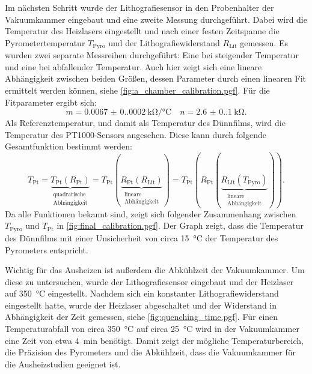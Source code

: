 Im nächsten Schritt wurde der Lithografiesensor in den Probenhalter der Vakuumkammer eingebaut und eine
zweite Messung durchgeführt.
Dabei wird die Temperatur des Heizlasers eingestellt und nach einer festen Zeitspanne die Pyrometertemperatur
$T_\mathrm{Pyro}$ und der Lithografiewiderstand $R_\mathrm{Lit}$ gemessen.
Es wurden zwei separate Messreihen durchgeführt: Eine bei steigender Temperatur und eine bei abfallender Temperatur.
Auch hier zeigt sich eine lineare Abhängigkeit zwischen beiden Größen, dessen Parameter durch einen linearen Fit
ermittelt werden können, siehe \cref{fig:a_chamber_calibration.pgf}.
Für die Fitparameter ergibt sich:
\begin{equation*}
    m = \qty{0.0067(0.0002)}{\kilo\ohm\per\degreeCelsius} \quad n = \qty{2.6(0.1)}{\kilo\ohm}.
\end{equation*}
Als Referenztemperatur, und damit als Temperatur des Dünnfilms, wird die Temperatur des PT1000-Sensors angesehen.
Diese kann durch folgende Gesamtfunktion bestimmt werden:
\begin{equation}
    T_{\mathrm{Pt}}=\underbrace{ T_{\mathrm{Pt}}(R_{\mathrm{Pt}}) }_{
        \substack{\text{quadratische} \\ \text{Abhängigkeit}}}
    =T_{\mathrm{Pt}}(\underbrace{ R_{\mathrm{Pt}}(R_{\mathrm{Lit}}) }_{
        \substack{\text{lineare} \\ \text{Abhängigkeit}}  })
    =T_{\mathrm{Pt}}(R_{\mathrm{Pt}}(\underbrace{ R_{\mathrm{Lit}}(T_{\mathrm{Pyro}}) }_{
        \substack{\text{lineare} \\ \text{Abhängigkeit}}  })).
    \label{eq:temperature_calibration}
\end{equation}
Da alle Funktionen bekannt sind, zeigt sich folgender Zusammenhang zwischen $T_{\mathrm{Pyro}}$ und $T_{\mathrm{Pt}}$
in \cref{fig:final_calibration.pgf}.
Der Graph zeigt, dass die Temperatur des Dünnfilms mit einer Unsicherheit von circa \qty{15}{\degreeCelsius}
der Temperatur des Pyrometers entspricht.

Wichtig für das Ausheizen ist außerdem die Abkühlzeit der Vakuumkammer.
Um diese zu untersuchen, wurde der Lithografiesensor eingebaut und der Heizlaser auf \qty{350}{\degreeCelsius}
eingestellt.
Nachdem sich ein konstanter Lithografiewiderstand eingestellt hatte, wurde der Heizlaser abgeschaltet und der
Widerstand in Abhängigkeit der Zeit gemessen, siehe \cref{fig:quenching_time.pgf}.
Für einen Temperaturabfall von circa \qty{350}{\degreeCelsius} auf circa \qty{25}{\degreeCelsius}
wird in der Vakuumkammer eine Zeit von etwa \qty{4}{\minute} benötigt.
Damit zeigt der mögliche Temperaturbereich, die Präzision des Pyrometers und die Abkühlzeit, dass
die Vakuumkammer für die Ausheizstudien geeignet ist.

